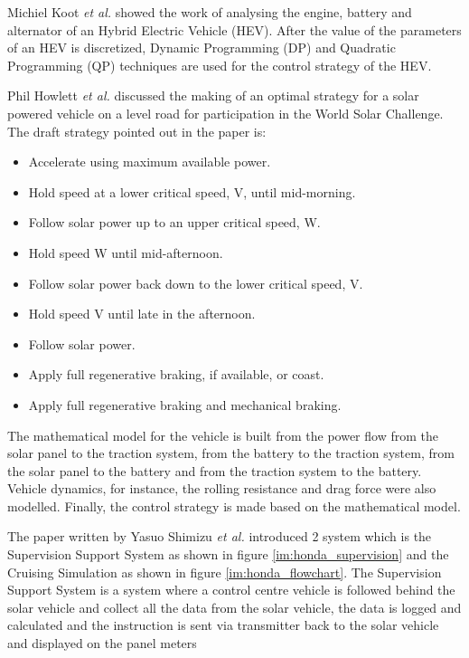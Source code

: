 Michiel Koot \textit{et al.} \citep{01433223} showed the work of analysing the engine, battery and alternator of an Hybrid Electric Vehicle (HEV). After the value of the parameters of an HEV is discretized, Dynamic Programming (DP) and Quadratic Programming (QP) techniques are used for the control strategy of the HEV.

Phil Howlett \textit{et al.} \citep{5095} discussed the making of an optimal strategy for a solar powered vehicle on a level road for participation in the World Solar Challenge. The draft strategy pointed out in the paper is:

\begin{itemize}
	\item{Accelerate using maximum available power.}
	\item{Hold speed at a lower critical speed, V, until mid-morning.}
	\item{Follow solar power up to an upper critical speed, W.}
	\item{Hold speed W until mid-afternoon.}
	\item{Follow solar power back down to the lower critical speed, V.}
	\item{Hold speed V until late in the afternoon.}
	\item{Follow solar power.}
	\item{Apply full regenerative braking, if available, or coast.}
	\item{Apply full regenerative braking and mechanical braking.}
\end{itemize}

The mathematical model for the vehicle is built from the power flow from the solar panel to the traction system, from the battery to the traction system, from the solar panel to the battery and from the traction system to the battery. Vehicle dynamics, for instance, the rolling resistance and drag force were also modelled. Finally, the control strategy is made based on the mathematical model.

The paper written by Yasuo Shimizu \textit{et al.} \citep{03894304} introduced 2 system which is the Supervision Support System as shown in figure \ref{im:honda_supervision} and the Cruising Simulation as shown in figure \ref{im:honda_flowchart}. The Supervision Support System is a system where a control centre vehicle is followed behind the solar vehicle and collect all the data from the solar vehicle, the data is logged and calculated and the instruction is sent via transmitter back to the solar vehicle and displayed on the panel meters


